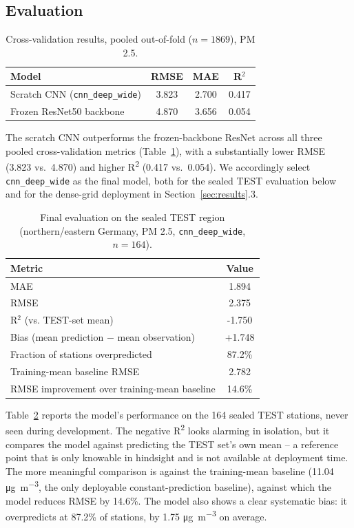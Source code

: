 \documentclass[english, a4paper, numbers=noenddot]{article}
\begin{document}

\subsection{Evaluation}

\begin{table}[h]
\centering
\caption{Cross-validation results, pooled out-of-fold ($n=1869$), PM 2.5.}
\label{tab:main_model_comparison}
\begin{tabular}{lccc}
\hline
\textbf{Model} & \textbf{RMSE} & \textbf{MAE} & \textbf{R}$^2$ \\
\hline
Scratch CNN (\texttt{cnn\_deep\_wide}) & 3.823 & 2.700 & 0.417 \\
Frozen ResNet50 backbone & 4.870 & 3.656 & 0.054 \\
\hline
\end{tabular}
\end{table}

The scratch CNN outperforms the frozen-backbone ResNet across all three pooled cross-validation metrics (Table~\ref{tab:main_model_comparison}), with a substantially lower RMSE (3.823 vs.\ 4.870) and higher R\textsuperscript{2} (0.417 vs.\ 0.054). We accordingly select \texttt{cnn\_deep\_wide} as the final model, both for the sealed TEST evaluation below and for the dense-grid deployment in Section~\ref{sec:results}.3.

\begin{table}[h]
\centering
\caption{Final evaluation on the sealed TEST region (northern/eastern Germany, PM 2.5, \texttt{cnn\_deep\_wide}, $n=164$).}
\label{tab:test_summary}
\begin{tabular}{lc}
\hline
\textbf{Metric} & \textbf{Value} \\
\hline
MAE & 1.894 \\
RMSE & 2.375 \\
R$^2$ (vs. TEST-set mean) & -1.750 \\
Bias (mean prediction $-$ mean observation) & +1.748 \\
Fraction of stations overpredicted & 87.2\% \\
Training-mean baseline RMSE & 2.782 \\
RMSE improvement over training-mean baseline & 14.6\% \\
\hline
\end{tabular}
\end{table}

Table~\ref{tab:test_summary} reports the model's performance on the 164 sealed TEST stations, never seen during development. The negative R\textsuperscript{2} looks alarming in isolation, but it compares the model against predicting the TEST set's own mean -- a reference point that is only knowable in hindsight and is not available at deployment time. The more meaningful comparison is against the training-mean baseline (11.04 \si{\micro\gram\per\cubic\meter}, the only deployable constant-prediction baseline), against which the model reduces RMSE by 14.6\%. The model also shows a clear systematic bias: it overpredicts at 87.2\% of stations, by 1.75 \si{\micro\gram\per\cubic\meter} on average.
\end{document}
